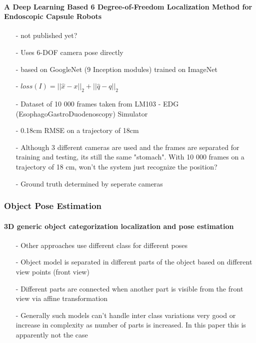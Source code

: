 	\paragraph{A Deep Learning Based 6 Degree-of-Freedom
		Localization Method for Endoscopic Capsule Robots \cite{Turan2017}}
	\begin{itemize}
		\item[-] not published yet?
		\item[-] Uses 6-DOF camera pose directly
		\item[-] based on GoogleNet (9 Inception modules) trained on ImageNet
		\item[-] $loss(I) = ||\hat{x}-x||_2 + ||\hat{q}-q||_2$
		\item[-] Dataset of 10 000 frames taken from LM103 - EDG (EsophagoGastroDuodenoscopy) Simulator
		\item[-] 0.18cm RMSE on a trajectory of 18cm
		\item[-] Although 3 different cameras are used and the frames are separated for training and testing, its still the same "stomach". With 10 000 frames on a trajectory of 18 cm, won't the system just recognize the position?
		\item[-] Ground truth determined by seperate cameras 
	\end{itemize}
	\subsubsection{Object Pose Estimation}
	\paragraph{3D generic object categorization localization and pose estimation \cite{Savarese}}
	\begin{itemize}
		\item[-] Other approaches use different class for different poses
		\item[-] Object model is separated in different parts of the object based on different view points (front view)
		\item[-] Different parts are connected when another part is visible from the front view via affine transformation
		\item[-] Generally such models can't handle inter class variations very good or increase in complexity as number of parts is increased. In this paper this is apparently not the case
	\end{itemize}
